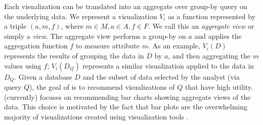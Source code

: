 Each \SeeDB visualization  can be translated into an agg\-re\-gate over group-by
 query on the underlying data.
We represent a visualization $V_i$ 
 as a function represented by a triple $(a, m, f)$, 
where $m \in M, a \in A, f \in F$.   
We call this an {\em aggregate view} or simply a {\em view}.
The aggregate view performs a group-by on $a$ and applies the aggregation function $f$ 
to measure attribute $m$. 
As an example, $V_i(D)$ represents the results of grouping
the data in $D$ by $a$, and then aggregating the $m$ values using $f$;
$V_i(D_Q)$ represents a similar visualization applied to
the data in $D_Q$.
Given a database $D$ and the subset of data selected by the analyst (via query $Q$), 
the goal of \SeeDB is to recommend visualizations of $Q$ that have high utility. 
\SeeDB (currently) focuses on recommending bar charts showing aggregate views of the 
data.
This choice is motivated by the fact that bar plots are the overwhelming
majority of visualizations created using visualization tools 
\cite{DBLP:journals/sigmod_record/MortonBGKM14}.
\fi
